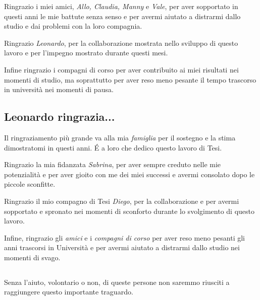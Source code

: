 Ringrazio i miei amici, \textit{Allo, Claudia, Manny} e \textit{Vale}, per aver sopportato in questi anni le mie battute senza senso e per avermi aiutato a distrarmi dallo studio e dai problemi con la loro compagnia.

Ringrazio \textit{Leonardo}, per la collaborazione mostrata nello sviluppo di questo lavoro e per l'impegno mostrato durante questi mesi.

Infine ringrazio i compagni di corso per aver contribuito ai miei risultati nei momenti di studio, ma soprattutto per aver reso meno pesante il tempo trascorso in università nei momenti di pausa.

\subsection*{Leonardo ringrazia...}

Il ringraziamento più grande va alla mia \textit{famiglia} per il sostegno e la stima dimostratomi in questi anni. \'E a loro che dedico questo lavoro di Tesi.

Ringrazio la mia fidanzata \textit{Sabrina}, per aver sempre creduto nelle mie potenzialità e per aver gioito con me dei miei successi e avermi consolato dopo le piccole sconfitte. 

Ringrazio il mio compagno di Tesi \textit{Diego}, per la collaborazione e per avermi sopportato e spronato nei momenti di sconforto durante lo svolgimento di questo lavoro.

Infine, ringrazio gli \textit{amici} e i \textit{compagni di corso} per aver reso meno pesanti gli anni trascorsi in Università e per avermi aiutato a distrarmi dallo studio nei momenti di svago.

\subsection*{}
Senza l'aiuto, volontario o non, di queste persone non saremmo riusciti a raggiungere questo importante traguardo.